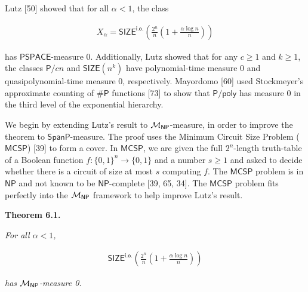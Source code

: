 Lutz [50] showed that for all $\alpha<1$, the class\par


\[\begin{gathered}
X_{\alpha}=\mathsf{SIZE}^{\mathsf{i.o.}}\!\!\left(\frac{2^{n}}{n}\left(1+\frac{\alpha\log n}{n}\right)\right)
\end{gathered}\]


has $\mathsf{PSPACE}$-measure 0. Additionally, Lutz showed that for any $c\geq 1$ and $k\geq 1$, the classes $\mathsf{P}/cn$ and $\mathsf{SIZE}\!(n^{k})$ have polynomial-time measure 0 and quasipolynomial-time measure 0, respectively.
Mayordomo [60] used Stockmeyer’s approximate counting
of ${\mathsf{\#}\mathsf{P}}$ functions [73] to show that $\mathsf{P}/\mathsf{poly}$ has
measure 0 in the third level of the exponential hierarchy.\par




We begin by extending Lutz’s result to ${{\cal M}_{\mathsf{NP}}}$-measure, in order to improve the theorem to $\mathsf{SpanP}$-measure. The proof uses the Minimum Circuit Size Problem ($\mathsf{MCSP}$) [39] to form a cover. In $\mathsf{MCSP}$, we are given the full $2^{n}$-length truth-table of a Boolean function $f:\{0,1\}^{n}\to\{0,1\}$ and a number $s\geq 1$ and asked to decide whether there is a circuit of size at most $s$ computing $f$. The $\mathsf{MCSP}$ problem is in $\mathsf{NP}$ and not known to be $\mathsf{NP}$-complete [39, 65, 34].
The $\mathsf{MCSP}$ problem fits perfectly into the ${{\cal M}_{\mathsf{NP}}}$ framework to help improve Lutz’s result.\par





\par\medskip\noindent\textbf{
\textbf{Theorem 6.1}\textbf{.}
}\par



\emph{For all $\alpha<1$,}\par


\[\begin{gathered}
\mathsf{SIZE}^{\mathsf{i.o.}}\!\!\left(\frac{2^{n}}{n}\left(1+\frac{\alpha\log
n}{n}\right)\right)
\end{gathered}\]


\emph{has ${{\cal M}_{\mathsf{NP}}}$-measure 0.}\par




